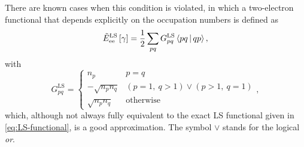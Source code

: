 \begin{enumerate}
        There are known cases when this condition is violated, in which a two-electron functional that depends 
        explicitly on the occupation numbers is defined as
        \begin{equation} \label{eq:Eee-LS-functional}
            \tilde{E}_{\text{ee}}^{\text{LS}} \left[ \fordm \right] =
            \frac{1}{2} \sum_{pq}  G_{pq}^{\text{LS}} \Braket{pq | qp},
        \end{equation}
        with 
        \begin{equation} \label{eq:GLS}
            G_{pq}^{\text{LS}} =
            \begin{cases}
                n_p & p = q \\
                - \sqrt{n_p n_q} & \left( p = 1,\ q > 1 \right) \vee \left( p>1,\ q=1 \right) \\
                \sqrt{n_p n_q} & \text{otherwise}
            \end{cases}
            ,
        \end{equation}
        which, although not always fully equivalent to the exact LS functional
        given in \cref{eq:LS-functional}, is a good approximation.
        The symbol $\vee$ stands for the logical \textit{or}.


\end{enumerate}
